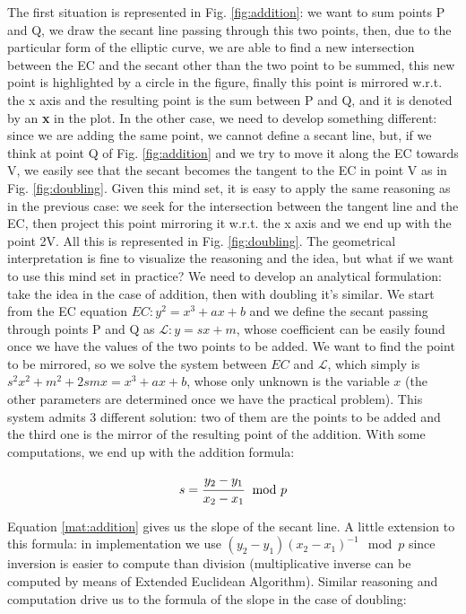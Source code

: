 \documentclass{article}
\begin{document}
The first situation is represented in Fig. \ref{fig:addition}: we want to sum points P and Q, we draw the secant line passing through this two points, then, due to the particular form of the elliptic curve, we are able to find a new intersection between the EC and the secant other than the two point to be summed, this new point is highlighted by a circle in the figure, finally this point is mirrored w.r.t. the x axis and the resulting point is the sum between P and Q, and it is denoted by an \textbf{x} in the plot.\newline
In the other case, we need to develop something different: since we are adding the same point, we cannot define a secant line, but, if we think at point Q of Fig. \ref{fig:addition} and we try to move it along the EC towards V, we easily see that the secant becomes the tangent to the EC in point V as in Fig. \ref{fig:doubling}. Given this mind set, it is easy to apply the same reasoning as in the previous case: we seek for the intersection between the tangent line and the EC, then project this point mirroring it w.r.t. the x axis and we end up with the point 2V. All this is represented in Fig. \ref{fig:doubling}. \newline
The geometrical interpretation is fine to visualize the reasoning and the idea, but what if we want to use this mind set in practice? We need to develop an analytical formulation: take the idea in the case of addition, then with doubling it's similar. We start from the EC equation $EC: y^2 = x^3 + ax +b$ and we define the secant passing through points P and Q as $\mathcal{L}: y = sx + m$, whose coefficient can be easily found once we have the values of the two points to be added. We want to find the point to be mirrored, so we solve the system between $EC$ and $\mathcal{L}$, which simply is $s^2x^2 + m^2 + 2smx =  x^3 + ax +b$, whose only unknown is the variable $x$ (the other parameters are determined once we have the practical problem). This system admits 3 different solution: two of them are the points to be added and the third one is the mirror of the resulting point of the addition. With some computations, we end up with the addition formula:

\begin{equation}
	s = \cfrac{y_2 - y_1}{x_2 - x_1} \mod p
	\label{mat:addition}
\end{equation}

Equation \ref{mat:addition} gives us the slope of the secant line. A little extension to this formula: in implementation we use $(y_2 - y_1)(x_2 - x_1)^{-1} \mod p$ since inversion is easier to compute than division (multiplicative inverse can be computed by means of Extended Euclidean Algorithm). Similar reasoning and computation drive us to the formula of the slope in the case of doubling:
\end{document}
